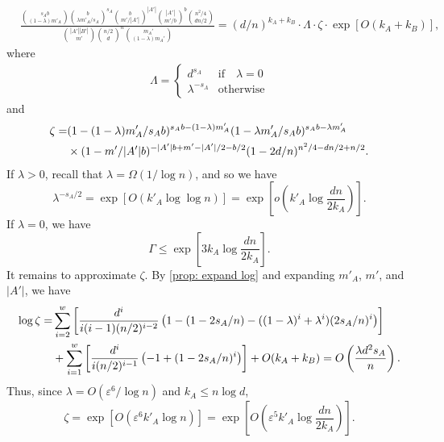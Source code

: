 \documentclass[11pt]{article}
\newcommand{\eps}{\varepsilon}
\theoremstyle{plain}
\begin{document}
\begin{align}
    &\frac{\binom{s_Ab}{(1 - \lambda )m'_A}\binom{b}{\lambda m'_A/s_A}^{s_A}\binom{b}{m'/|A'|}^{|A'|}\binom{|A'|}{m'/b}^{b}\binom{n^2/4}{dn/2}}                {\binom{|A'||B'|}{m'}\binom{n/2}{d}^{n}\binom{m_A'}{(1 - \lambda )m_A'}} = 
    (d/n)^{k_A + k_B} \cdot \Lambda \cdot \zeta \cdot \exp\left[O(k_A + k_B)\right],\label{eq: simplified equation}
\end{align}
where 
\begin{align*}
   \Lambda = \begin{cases}
        d^{s_A} &\text{if}\quad \lambda = 0\\
        \lambda^{-s_A}&\text{otherwise}
    \end{cases}
\end{align*}
and 
\begin{align}
    \zeta =& (1 - (1 - \lambda )m'_A/s_Ab)^{s_Ab - (1 - \lambda )m'_A}(1 - \lambda m'_A/s_Ab)^{s_Ab-\lambda m'_A}\notag\\
    &\times(1 - m'/|A'|b)^{-|A'|b + m' - |A'|/2 - b/2}(1 - 2d/n)^{n^2/4 - dn/2 + n/2}.\label{eq: janson 0 bad zeta}
\end{align}
If $\lambda >0$, recall that $\lambda  = \Omega(1/\log n)$, and so we have 
\begin{equation}\label{eq: bound lambda term}
    \lambda ^{-s_A/2} = \exp[O(k'_A\log\log n)] = \exp\left[o\left(k'_A\log\frac{dn}{2k_A}\right)\right].
\end{equation}
If $\lambda = 0$, we have 
\begin{equation}\label{eq: Gamma when gamma 0}
    \Gamma \leq \exp\left[3k_A\log\frac{dn}{2k_A}\right].
\end{equation}
It remains to approximate $\zeta$. By \cref{prop: expand log} and expanding $m'_A$, $m'$, and $|A'|$, we have
\begin{align}
    \log \zeta =& \sum_{i = 2}^w  \left[\frac{d^i}{i(i-1)(n/2)^{i-2}}\left(1 - (1 - 2s_A/n) -((1 - \lambda )^i + \lambda ^i) (2s_A/n)^i\right)\right] \notag\\
    &+\sum_{i = 1}^w\left[\frac{d^i}{i(n/2)^{i-1}}\left(-1 + (1 - 2s_A/n)^i\right)\right]+ O(k_A + k_B) = O\left(\frac{\lambda d^2s_A}{n}\right).\notag
\end{align}
Thus, since $\lambda  = O(\eps^6/\log n)$ and $k_A \leq n\log d$, 
\begin{equation}\label{eq: final zeta}
    \zeta = \exp\left[O\left(\eps^6k'_A\log n\right)\right] = \exp\left[O\left(\eps^5k'_A\log\frac{dn}{2k_A}\right)\right].
\end{equation}
\end{document}
